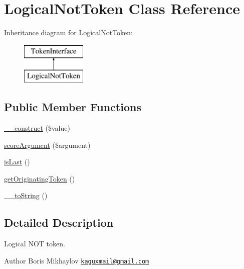 \hypertarget{class_prophecy_1_1_argument_1_1_token_1_1_logical_not_token}{}\section{Logical\+Not\+Token Class Reference}
\label{class_prophecy_1_1_argument_1_1_token_1_1_logical_not_token}
Inheritance diagram for Logical\+Not\+Token\+:\begin{figure}[H]
\begin{center}
\leavevmode
\includegraphics[height=2.000000cm]{class_prophecy_1_1_argument_1_1_token_1_1_logical_not_token}
\end{center}
\end{figure}
\subsection*{Public Member Functions}
\begin{DoxyCompactItemize}
\item 
\mbox{\hyperlink{class_prophecy_1_1_argument_1_1_token_1_1_logical_not_token_a7e17a19b592345a03763f050fffe0ce7}{\+\_\+\+\_\+construct}} (\$value)
\item 
\mbox{\hyperlink{class_prophecy_1_1_argument_1_1_token_1_1_logical_not_token_a8d5bf47ab6eaa935458d5ad160e52822}{score\+Argument}} (\$argument)
\item 
\mbox{\hyperlink{class_prophecy_1_1_argument_1_1_token_1_1_logical_not_token_ac72b8349b1340887fc1af30eca2b951c}{is\+Last}} ()
\item 
\mbox{\hyperlink{class_prophecy_1_1_argument_1_1_token_1_1_logical_not_token_afa683ad8d8d52302e7f769d3bdf9fc4b}{get\+Originating\+Token}} ()
\item 
\mbox{\hyperlink{class_prophecy_1_1_argument_1_1_token_1_1_logical_not_token_a7516ca30af0db3cdbf9a7739b48ce91d}{\+\_\+\+\_\+to\+String}} ()
\end{DoxyCompactItemize}


\subsection{Detailed Description}
Logical N\+OT token.

\begin{DoxyAuthor}{Author}
Boris Mikhaylov \href{mailto:kaguxmail@gmail.com}{\tt kaguxmail@gmail.\+com} 
\end{DoxyAuthor}


